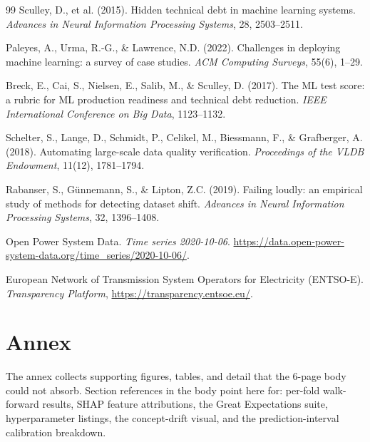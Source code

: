 \documentclass[11pt,a4paper]{article}
\begin{document}
\begin{thebibliography}{99}
Sculley, D., et al. (2015).
Hidden technical debt in machine learning systems.
\textit{Advances in Neural Information Processing Systems}, 28, 2503--2511.

Paleyes, A., Urma, R.-G., \& Lawrence, N.D. (2022).
Challenges in deploying machine learning: a survey of case studies.
\textit{ACM Computing Surveys}, 55(6), 1--29.

Breck, E., Cai, S., Nielsen, E., Salib, M., \& Sculley, D. (2017).
The ML test score: a rubric for ML production readiness and technical debt reduction.
\textit{IEEE International Conference on Big Data}, 1123--1132.

Schelter, S., Lange, D., Schmidt, P., Celikel, M., Biessmann, F., \& Grafberger, A. (2018).
Automating large-scale data quality verification.
\textit{Proceedings of the VLDB Endowment}, 11(12), 1781--1794.

Rabanser, S., G\"unnemann, S., \& Lipton, Z.C. (2019).
Failing loudly: an empirical study of methods for detecting dataset shift.
\textit{Advances in Neural Information Processing Systems}, 32, 1396--1408.

Open Power System Data.
\textit{Time series 2020-10-06}.
\url{https://data.open-power-system-data.org/time_series/2020-10-06/}.

European Network of Transmission System Operators for Electricity (ENTSO-E).
\textit{Transparency Platform}, \url{https://transparency.entsoe.eu/}.

\end{thebibliography}

\clearpage
\setcounter{section}{0}
\renewcommand{\thesection}{\Alph{section}}
\section*{Annex}

The annex collects supporting figures, tables, and detail that the 6-page body could not absorb. Section references in the body point here for: per-fold walk-forward results, SHAP feature attributions, the Great Expectations suite, hyperparameter listings, the concept-drift visual, and the prediction-interval calibration breakdown.
\end{document}
